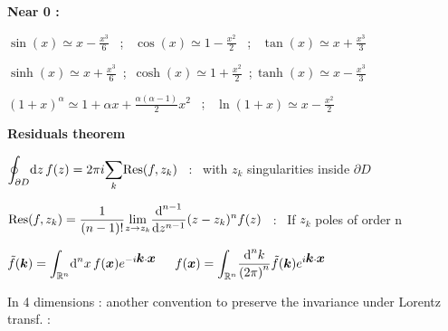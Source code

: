 
\item[] \textbf{Near 0 :}
\item $\sin(x) \simeq x - \frac{x^{3}}{6}$ \, ; \, $\cos(x) \simeq 1 - \frac{x^{2}}{2}$ \, ; \, $\tan(x) \simeq x + \frac{x^{3}}{3}$
\item $\sinh(x) \simeq x + \frac{x^{3}}{6}$  \,;\, $\cosh(x) \simeq 1 + \frac{x^{2}}{2}$   \,;\,$\tanh(x) \simeq x - \frac{x^{3}}{3}$
\item $\left(1+x \right)^{\alpha} \simeq 1 + \alpha x + \frac{\alpha(\alpha -1)}{2}x^2$ \, ; \, $\ln(1+x) \simeq x - \frac{x^2}{2} $ 
\item[] \textbf{Residuals theorem}
\item $\displaystyle{\oint_{\partial D}} \textrm{d} z \, f(z) = 2\pi i \displaystyle{\sum_{k}} \text{Res}(f,z_k)$ \, : \, with $z_k$ singularities inside $\partial D$  %

\item $\text{Res}(f,z_k) = \dfrac{1}{(n-1)!} \displaystyle{\lim_{z \rightarrow z_k}} \dfrac{\textrm{d} ^{n-1}}{\textrm{d} z^{n-1}} (z-z_k)^{n} f(z)$ \, : \, If $z_k$ poles of order n  
\squishend
{}

$\tilde{f}(\mbox{\boldmath$k$}) = \displaystyle{\int_{\mathbb{R}^n}} \textrm{d} ^n x \, f(\mbox{\boldmath$x$}) e^{-i\mbox{\boldmath$k$}\cdot\mbox{\boldmath$x$}}$ $ \quad f(\mbox{\boldmath$x$}) = \displaystyle{\int_{\mathbb{R}^n}} \dfrac{\textrm{d} ^n k}{\left(2\pi\right)^n} \tilde{f}(\mbox{\boldmath$k$})e^{i \mbox{\boldmath$k$}\cdot\mbox{\boldmath$x$}}$  

In 4 dimensions : another convention to preserve the invariance under Lorentz transf. : 

